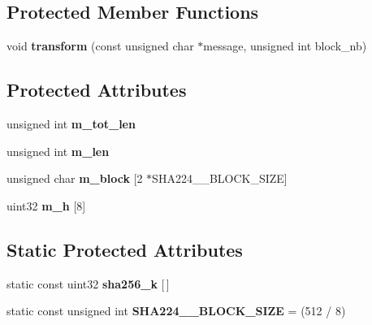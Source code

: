 \subsection*{Protected Member Functions}
\begin{DoxyCompactItemize}
\item 
\mbox{\label{class_s_h_a256_a97f83033c1ff262737e763aa89be9487}} 
void {\bfseries transform} (const unsigned char $\ast$message, unsigned int block\+\_\+nb)
\end{DoxyCompactItemize}
\subsection*{Protected Attributes}
\begin{DoxyCompactItemize}
\item 
\mbox{\label{class_s_h_a256_a322a3833dfe2b5b01f91e05fcab90177}} 
unsigned int {\bfseries m\+\_\+tot\+\_\+len}
\item 
\mbox{\label{class_s_h_a256_aa692469ace938c44a2fda98432e051cb}} 
unsigned int {\bfseries m\+\_\+len}
\item 
\mbox{\label{class_s_h_a256_aee6109fbc9d62b228e2c8f8203884660}} 
unsigned char {\bfseries m\+\_\+block} \mbox{[}2 $\ast$S\+H\+A224\+\_\+\_\+\+B\+L\+O\+C\+K\+\_\+\+S\+I\+ZE\mbox{]}
\item 
\mbox{\label{class_s_h_a256_a515335b007cd905b9e8a5b9e080687bb}} 
uint32 {\bfseries m\+\_\+h} \mbox{[}8\mbox{]}
\end{DoxyCompactItemize}
\subsection*{Static Protected Attributes}
\begin{DoxyCompactItemize}
\item 
static const uint32 {\bfseries sha256\+\_\+k} \mbox{[}$\,$\mbox{]}
\item 
\mbox{\label{class_s_h_a256_a2f94636534fc339f3210c12ec746bcb9}} 
static const unsigned int {\bfseries S\+H\+A224\+\_\+\_\+\+B\+L\+O\+C\+K\+\_\+\+S\+I\+ZE} = (512 / 8)
\end{DoxyCompactItemize}


